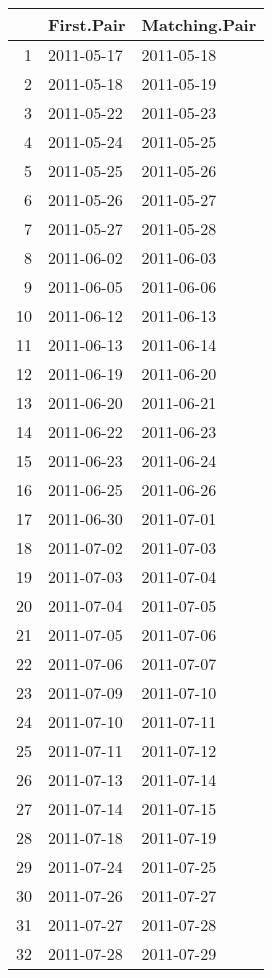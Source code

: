 \begin{longtable}{rll}
  \hline
 & First.Pair & Matching.Pair \\ 
  \hline
1 & 2011-05-17 & 2011-05-18 \\ 
  2 & 2011-05-18 & 2011-05-19 \\ 
  3 & 2011-05-22 & 2011-05-23 \\ 
  4 & 2011-05-24 & 2011-05-25 \\ 
  5 & 2011-05-25 & 2011-05-26 \\ 
  6 & 2011-05-26 & 2011-05-27 \\ 
  7 & 2011-05-27 & 2011-05-28 \\ 
  8 & 2011-06-02 & 2011-06-03 \\ 
  9 & 2011-06-05 & 2011-06-06 \\ 
  10 & 2011-06-12 & 2011-06-13 \\ 
  11 & 2011-06-13 & 2011-06-14 \\ 
  12 & 2011-06-19 & 2011-06-20 \\ 
  13 & 2011-06-20 & 2011-06-21 \\ 
  14 & 2011-06-22 & 2011-06-23 \\ 
  15 & 2011-06-23 & 2011-06-24 \\ 
  16 & 2011-06-25 & 2011-06-26 \\ 
  17 & 2011-06-30 & 2011-07-01 \\ 
  18 & 2011-07-02 & 2011-07-03 \\ 
  19 & 2011-07-03 & 2011-07-04 \\ 
  20 & 2011-07-04 & 2011-07-05 \\ 
  21 & 2011-07-05 & 2011-07-06 \\ 
  22 & 2011-07-06 & 2011-07-07 \\ 
  23 & 2011-07-09 & 2011-07-10 \\ 
  24 & 2011-07-10 & 2011-07-11 \\ 
  25 & 2011-07-11 & 2011-07-12 \\ 
  26 & 2011-07-13 & 2011-07-14 \\ 
  27 & 2011-07-14 & 2011-07-15 \\ 
  28 & 2011-07-18 & 2011-07-19 \\ 
  29 & 2011-07-24 & 2011-07-25 \\ 
  30 & 2011-07-26 & 2011-07-27 \\ 
  31 & 2011-07-27 & 2011-07-28 \\ 
  32 & 2011-07-28 & 2011-07-29 \\ 

\end{longtable}
